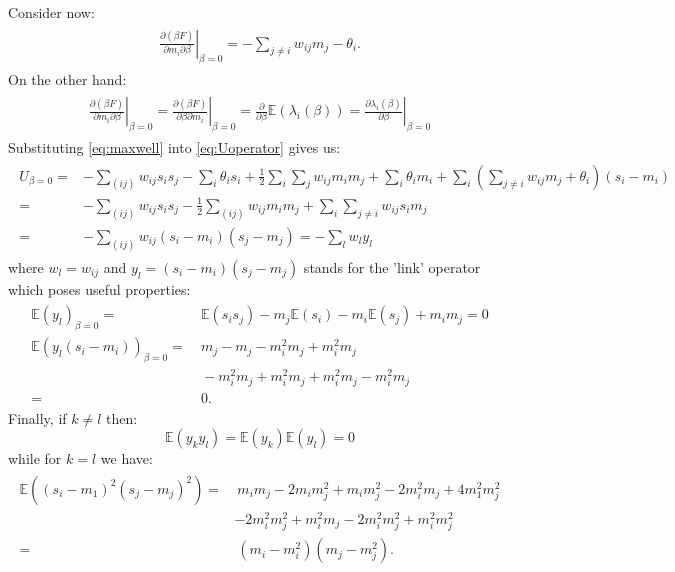 Consider now:
\begin{align}
\begin{split}
\left.\frac{\partial (\beta F)}{\partial m_i \partial \beta}\right|_{\beta = 0} = 
- \sum_{j \neq i} w_{ij} m_j - \theta_i.
\end{split}
\end{align}
On the other hand:
\begin{align}
\begin{split}
\left. \frac{\partial (\beta F)}{\partial m_i \partial \beta}\right|_{\beta = 0} = \left. \frac{\partial (\beta F)}{\partial \beta \partial m_i }\right|_{\beta = 0} = \frac{\partial}{\partial \beta} \mathbb{E} (\lambda_i(\beta)) =  \left. \frac{\partial \lambda_i (\beta)}{\partial \beta}\right|_{\beta =0}
 \label{eq:maxwell}
 \end{split}
\end{align}
Substituting  \ref{eq:maxwell} into \ref{eq:Uoperator} gives us:
\begin{align}
\begin{split}
U_{\beta = 0} = & -\sum_{(ij)} w_{ij}s_is_j -\sum_i \theta_i s_i + \frac{1}{2} \sum_i \sum_j w_{ij} m_i m_j + \sum_i \theta_i m_i + \sum_i \left(\sum_{j \neq i} w_{ij} m_j  + \theta_i \right)(s_i - m_i ) \\
= & -\sum_{(ij)} w_{ij}s_i s_j - \frac{1}{2}\sum_{(ij)} w_{ij} m_i m_j + \sum_i \sum_{j \neq i} w_{ij} s_i m_j \\
= & - \sum_{(ij)} w_{ij} (s_i - m_i)(s_j- m_j) = - \sum_l w_l y_l
 \end{split}
\end{align}
where $w_l = w_{ij}$ and $y_l = (s_i -m_i)(s_j-m_j)$ stands for the 'link' operator which poses useful properties:
\begin{align}
\begin{split}
\mathbb{E}(y_l)_{\beta =0} = & ~\mathbb{E}(s_i s_j) -m_j\mathbb{E}(s_i) - m_i\mathbb{E}(s_j) + m_i m_j = 0 \\
\mathbb{E}(y_l(s_i-m_i))_{\beta =0} = & ~ m_j - m_j -m_i^2m_j + m_i^2m_j \\
 & ~ - m_i^2m_j + m_i^2m_j + m_i^2m_j - m_i^2m_j \\
 = &~ 0.
 \end{split}
\end{align}
Finally, if $k \neq l$ then:
$$\mathbb{E}(y_k y_l)= \mathbb{E}(y_k)\mathbb{E}(y_l)=0$$
while for $k = l$ we have:
\begin{align}
\begin{split}
\mathbb{E}((s_i-m_1)^2(s_j-m_j)^2)= & ~m_im_j - 2m_im_j^2 +m_im_j^2 - 2m_i^2m_j + 4m_1^2m_j^2\\
& - 2m_i^2m_j^2 + m_i^2m_j -2m_i^2m_j^2 + m_i^2m_j^2 \\
= & ~ (m_i -m_i^2)(m_j-m_j^2).
\label{eq:Yoperator}
 \end{split}
\end{align}
